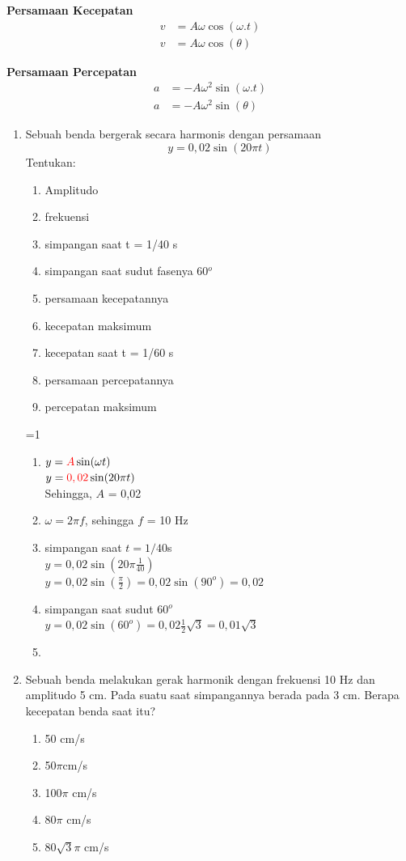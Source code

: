 \documentclass[10pt,a4paper]{extarticle}
\def\tampilkunci{1}
\newcommand{\hide}[1]{\ifnum\tampilkunci=1
%
\begin{mybox}
 #1
\end{mybox}
%
\vspace{\baselineskip}\fi}
\newcommand*\merah[1]{
\textcolor{red}{#1}}
\newcommand{\pilgani}[1]{                            \vspace{-0.3cm}\begin{multicols}{2}
 \begin{enumerate}[label=\Alph*., itemsep=0pt,topsep=0pt,leftmargin=*,align=Center]#1                     \end{enumerate}
 \phantom{ini cuma sapi, wedus, dan ayam}
 \end{multicols}}
\begin{document}
\begin{multicols*}{2}
\textbf{Persamaan Kecepatan}
\begin{align*}
v&=A\omega \cos(\omega.t)\\
v&=A\omega\cos(\theta)
\end{align*}

\textbf{Persamaan Percepatan}
\begin{align*}
a &= -A\omega^2\sin(\omega.t)\\
a &= -A\omega^2\sin(\theta)
\end{align*}

\vspace{2cm}

\begin{enumerate}
\item Sebuah benda bergerak secara harmonis dengan persamaan $$y = 0,02 \sin (20\pi t) $$
Tentukan:
\begin{enumerate}[noitemsep,label=\alph*.]
\item Amplitudo
\item frekuensi
\item simpangan saat t = 1/40 s
\item simpangan saat sudut fasenya 60$^o$
\item persamaan kecepatannya
\item kecepatan maksimum
\item kecepatan saat t = 1/60 s
\item persamaan percepatannya
\item percepatan maksimum
\end{enumerate}
\hide{
\begin{enumerate}[noitemsep,label=\alph*.]
   \item$ y = \merah{ A} \sin (\omega t)$\\
      $y = \merah{0,02} \sin (20 \pi t)$\\
      Sehingga, $A$ = 0,02
   \item $\omega = 2\pi f$, sehingga $f$ = 10 Hz
   \item simpangan saat $t= 1/40$s \\
      $y = 0,02 \sin (20 \pi \frac{1}{40})$\\
      $y = 0,02 \sin (\frac{\pi}{2}) = 0,02 \sin (90^o) = 0,02$ 
   \item simpangan saat sudut 60$^o$\\
      $y = 0,02 \sin (60^o)=0,02 \frac{1}{2}\sqrt{3}=0,01\sqrt{3}$\\
   \item 

\end{enumerate}}
\item Sebuah benda melakukan gerak harmonik dengan frekuensi 10 Hz dan amplitudo 5 cm. Pada suatu saat simpangannya berada pada 3 cm. Berapa kecepatan benda saat itu?
\pilgani{
\item 50 cm/s
\item 50$\pi$cm/s
\item 100$\pi$ cm/s
\item 80$\pi$ cm/s
\item 80$\sqrt{3}\pi$ cm/s
}
\vspace{3cm}


\end{enumerate}
\end{multicols*}
\end{document}
